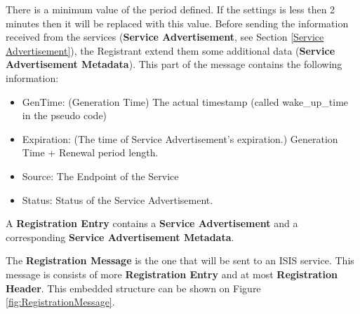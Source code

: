 \documentclass{article}                            %
\begin{document}
There is a minimum value of the period defined. If the settings is less then 2 minutes then it will be replaced with this value.
Before sending the information received from the services (\textbf{Service Advertisement}, see Section \ref{Service Advertisement}), the Registrant extend them some additional data (\textbf{Service Advertisement Metadata}). This part of the message contains the following information:
\begin{itemize}
  \item GenTime: (Generation Time) The actual timestamp (called wake\_up\_time in the pseudo code)
  \item Expiration: (The time of Service Advertisement's expiration.)  Generation Time + Renewal period length.
  \item Source: The Endpoint of the Service
  \item Status: Status of the Service Advertisement.
\end{itemize}
A \textbf{Registration Entry} contains a \textbf{Service Advertisement} and a corresponding \textbf{Service Advertisement Metadata}.\par
The \textbf{Registration Message} is the one that will be sent to an ISIS service. This message is consists of more \textbf{Registration Entry} and at most \textbf{Registration Header}.  This embedded structure can be shown on Figure \ref{fig:RegistrationMessage}.
\begin{figure}[ht]
\end{figure}
\end{document}
